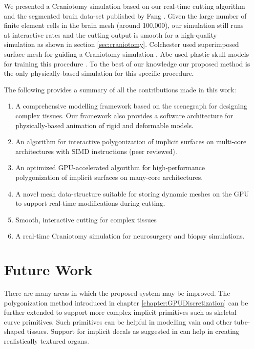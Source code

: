 We presented a Craniotomy simulation based on our real-time cutting algorithm and the segmented 
brain data-set published by Fang \etal \cite{fang2010mesh}. Given the large number of finite element 
cells in the brain mesh (around 100,000), our simulation still runs at interactive rates and the cutting 
output is smooth for a high-quality simulation as shown in section \ref{sec:craniotomy}. Colchester 
\etal used superimposed surface mesh for guiding a Craniotomy simulation \cite{Colchester1994}. 
Abe \etal used plastic skull models for training this procedure \cite{Abe1998}. To the best of our 
knowledge our proposed method is the only physically-based simulation for this specific procedure. 

The following provides a summary of all the contributions made in this work:

\begin{enumerate}
  
\item A comprehensive modelling framework based on the \blob scenegraph for designing complex 
tissues. Our framework also provides a software architecture for physically-based animation of rigid and 
deformable models.
 
 \item An algorithm for interactive polygonization of implicit surfaces on multi-core architectures with 
 SIMD instructions (peer reviewed). 
 
 \item An optimized GPU-accelerated algorithm for high-performance polygonization of implicit surfaces 
 on many-core architectures. 
 
 \item A novel mesh data-structure suitable for storing dynamic meshes on the GPU to support real-time 
 modifications during cutting.
 
 \item Smooth, interactive cutting for complex tissues 
 
\item A real-time Craniotomy simulation for neurosurgery and biopsy simulations.

\end{enumerate} 





\section{Future Work}
There are many areas in which the proposed system may be improved. The polygonization method 
introduced in chapter \ref{chapter:GPUDiscretization} can be further extended to support more 
complex implicit primitives such as skeletal curve primitives. Such primitives can be helpful in modelling 
vain and other tube-shaped tissues. Support for implicit decals as suggested in \cite{DeGroot2014} can help 
in creating realistically textured organs. 

